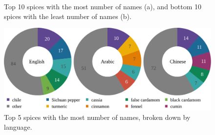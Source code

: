 
\begin{figure}[!ht]
	\centering
	\hfill
	\caption[Top and bottom spices by number of names.]{Top 10 spices with the most number of names (a), and bottom 10 spices with the least number of names (b).}
	\label{fig:ids_top_and_bottom_ann}
\end{figure}

\begin{figure}[!ht]
	\centering
	\includegraphics[width=\linewidth]{imgs/plots/ids_trio.pdf}
	\caption[Top spices by number of names, broken down by language.]{Top 5 spices with the most number of names, broken down by language.}
	\label{fig:ids_trio}
\end{figure}



